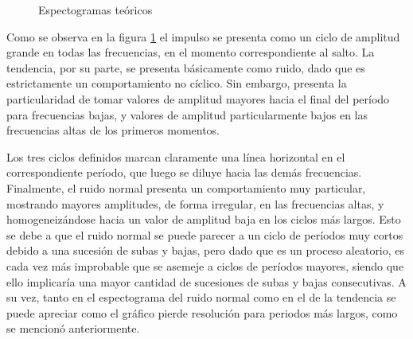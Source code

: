 \documentclass[a4paper]{article}
\begin{document}
\begin{figure}[H]
	    \vspace{0.00mm}
	    \vspace{0.00mm}
	\caption{Espectogramas teóricos} \label{fig:espect_teo}
\end{figure}

Como se observa en la figura \ref{fig:espect_teo} el impulso se presenta como un ciclo de amplitud grande en todas las frecuencias, en el momento correspondiente al salto. La tendencia, por su parte, se presenta básicamente como ruido, dado que es estrictamente un comportamiento no cíclico. Sin embargo, presenta la particularidad de tomar valores de amplitud mayores hacia el final del período para frecuencias bajas, y valores de amplitud particularmente bajos en las frecuencias altas de los primeros momentos.

Los tres ciclos definidos marcan claramente una línea horizontal en el correspondiente período, que luego se diluye hacia las demás frecuencias. Finalmente, el ruido normal presenta un comportamiento muy particular, mostrando mayores amplitudes, de forma irregular, en las frecuencias altas, y homogeneizándose hacia un valor de amplitud baja en los ciclos más largos. Esto se debe a que el ruido normal se puede parecer a un ciclo de períodos muy cortos debido a una sucesión de subas y bajas, pero dado que es un proceso aleatorio, es cada vez más improbable que se asemeje a ciclos de períodos mayores, siendo que ello implicaría una mayor cantidad de sucesiones de subas y bajas consecutivas. A su vez, tanto en el espectograma del ruido normal como en el de la tendencia se puede apreciar como el gráfico pierde resolución para periodos más largos, como se mencionó anteriormente. 
\end{document}
